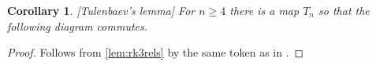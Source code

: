 \documentclass[oneside,12pt]{amsart}
\DeclareRobustCommand{\VAN}[2]{#1}
\numberwithin{equation}{section}
\numberwithin{lem}{section}
\newtheorem{cor}[lem]{Corollary}
\theoremstyle{definition}
\theoremstyle{remark}
\begin{document}
\begin{appendices}
\begin{cor}\label{cor:tulmap}[Tulenbaev's lemma] For $n \geq 4$ there is a map $T_n$ so that the following diagram commutes.

\end{cor}
\begin{proof} Follows from \cref{lem:rk3rels} by the same token as in \cite[Lemma~2.3]{Tu}. \end{proof}

\end{appendices}

\DeclareRobustCommand{\VAN}[2]{#2}
\printbibliography
\end{document}
